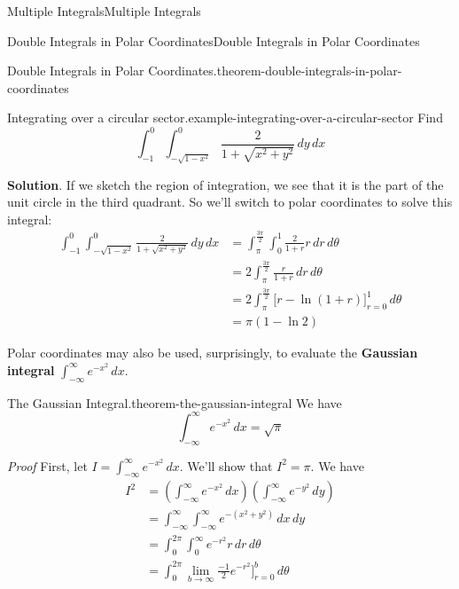 \documentclass[10pt,]{book}
\makeatletter
\newcommand{\terminology}[1]{\textbf{#1}}
\renewcommand*{\proofname}{Proof}
\renewenvironment{proof}[1][\proofname]{\par
  \pushQED{\qed}%
  \normalfont \topsep6\p@\@plus6\p@\relax
  \trivlist
  \item\relax
    {\itshape
    #1\@addpunct{.}}\hspace\labelsep\ignorespaces
}{%
  \popQED\endtrivlist\@endpefalse
}
\numberwithin{equation}{section}
\makeatother
\begin{document}
\begin{chapterptx}{Multiple Integrals}{}{Multiple Integrals}{}{}
\begin{sectionptx}{Double Integrals in Polar Coordinates}{}{Double Integrals in Polar Coordinates}{}{}
\begin{theorem}{Double Integrals in Polar Coordinates.}{}{theorem-double-integrals-in-polar-coordinates}
\end{theorem}
\begin{example}{Integrating over a circular sector.}{example-integrating-over-a-circular-sector}%
\hypertarget{p-1271}{}%
Find%
\begin{equation*}
\int_{-1}^{0}\int_{-\sqrt{1-x^{2}}}^{0}\frac{2}{1+\sqrt{x^{2} + y^{2}}}\,dy\,dx
\end{equation*}
%
\par\smallskip%
\noindent\textbf{Solution}.\hypertarget{solution-202}{}\quad%
\hypertarget{p-1272}{}%
If we sketch the region of integration, we see that it is the part of the unit circle in the third quadrant. So we'll switch to polar coordinates to solve this integral:%
\begin{align*}
\int_{-1}^{0}\int_{-\sqrt{1-x^{2}}}^{0}\frac{2}{1+\sqrt{x^{2} + y^{2}}}\,dy\,dx & = \int_{\pi}^{\frac{3\pi}{2}}\int_{0}^{1}\frac{2}{1+r}r\,dr\,d\theta \\
& = 2\int_{\pi}^{\frac{3\pi}{2}} \frac{r}{1+r}\,dr\,d\theta \\
& = 2\int_{\pi}^{\frac{3\pi}{2}} \bigg[r - \ln(1+r)\bigg]_{r=0}^{1}\,d\theta \\
& = \pi(1-\ln2) 
\end{align*}
%
\end{example}
\hypertarget{p-1273}{}%
Polar coordinates may also be used, surprisingly, to evaluate the \terminology{Gaussian integral} \(\int_{-\infty}^{\infty}e^{-x^{2}}\,dx\).%
\begin{theorem}{The Gaussian Integral.}{}{theorem-the-gaussian-integral}%
\hypertarget{p-1274}{}%
We have%
\begin{equation*}
\int_{-\infty}^{\infty}e^{-x^{2}}\,dx = \sqrt{\pi}
\end{equation*}
%
\end{theorem}
\begin{proof}\hypertarget{proof-15}{}
\hypertarget{p-1275}{}%
First, let \(I = \int_{-\infty}^{\infty}e^{-x^{2}}\,dx\). We'll show that \(I^{2} = \pi\). We have%
\begin{align*}
I^{2} & = \left(\int_{-\infty}^{\infty}e^{-x^{2}}\,dx\right)\left(\int_{-\infty}^{\infty}e^{-y^{2}}\,dy\right) \\
& = \int_{-\infty}^{\infty}\int_{-\infty}^{\infty}e^{-(x^{2} + y^{2})}\,dx\,dy \\
& = \int_{0}^{2\pi}\int_{0}^{\infty}e^{-r^{2}}r\,dr\,d\theta \\
& = \int_{0}^{2\pi} \lim_{b\to\infty}\frac{-1}{2}e^{-r^{2}}\bigg]_{r=0}^{b}\,d\theta \\

\end{align*}
\end{proof}
\end{sectionptx}
\end{chapterptx}
\end{document}
